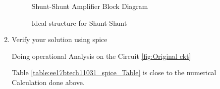\begin{enumerate}[label=\thesection.\arabic*.,ref=\thesection.\theenumi]
\begin{table}[!ht]
\centering

\caption{}
\label{table:ee17btech11031_value_Table}
\end{table}

 \begin{figure}[!ht]
 	\begin{center}
 			\resizebox{\columnwidth}{!}{}
 	\end{center}
 \caption{Shunt-Shunt Amplifier Block Diagram}
 \label{fig: ss2 ckt}
 \end{figure}

 \begin{figure}[!ht]
 	\begin{center}
 			\resizebox{\columnwidth}{!}{}
 	\end{center}
 \caption{Ideal structure for Shunt-Shunt}
 \label{fig:ideal ckt}
 \end{figure}
 
\item Verify your solution using spice

\solution Doing operational Analysis on the Circuit \ref{fig:Original ckt}

\begin{table}[!ht]
\centering

\caption{}
\label{table:ee17btech11031_spice_Table}
\end{table}

Table \ref{table:ee17btech11031_spice_Table} is close to the numerical Calculation done above.
 \end{enumerate}
